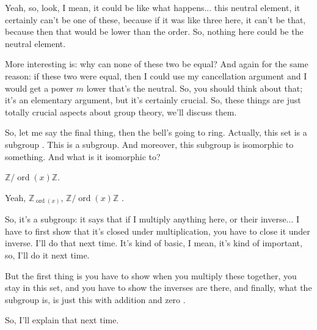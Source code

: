 \begin{speech}[01:27:30 - 01:28:08]
Yeah, so, look, I mean, it could be like what happens... this neutral element, it certainly can't be one of these, because if it was like three here, it can't be that, because then that would be lower than the order. So, nothing here could be the neutral element.

More interesting is: why can none of these two be equal? And again for the same reason: if these two were equal, then I could use my cancellation argument and I would get a power $m$ lower that's the neutral. So, you should think about that; it's an elementary argument, but it's certainly crucial. So, these things are just totally crucial aspects about group theory, we'll discuss them.

So, let me say the final thing, then the bell's going to ring. Actually, this set is a subgroup . This is a subgroup. And moreover, this subgroup is isomorphic to something. And what is it isomorphic to?
\end{speech}

\begin{student}
$\mathbb{Z} / \operatorname{ord}(x)\mathbb{Z}$.
\end{student}

\begin{speech}[01:28:08 - 01:28:18]
Yeah, $\mathbb{Z}_{\operatorname{ord}(x)}$, $\mathbb{Z}/\operatorname{ord}(x)\mathbb{Z}$ .

So, it's a subgroup: it says that if I multiply anything here, or their inverse... I have to first show that it's closed under multiplication, you have to close it under inverse. I'll do that next time. It's kind of basic, I mean, it's kind of important, so, I'll do it next time.

But the first thing is you have to show when you multiply these together, you stay in this set, and you have to show the inverses are there, and finally, what the subgroup is, is just this with addition and zero .

So, I'll explain that next time. 
\end{speech}

